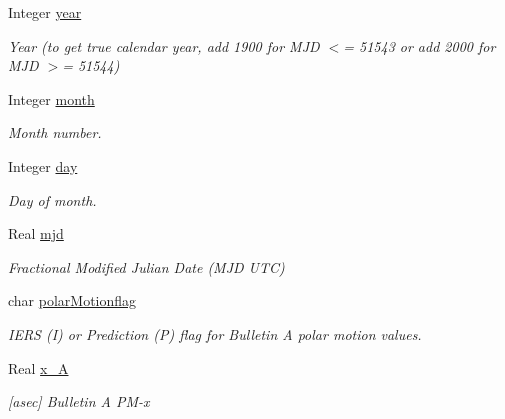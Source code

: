 \begin{DoxyCompactItemize}
\item 
Integer \hyperlink{structostk_1_1physics_1_1coord_1_1frame_1_1provider_1_1iers_1_1_finals2000_a_1_1_data_aaa754f31dcd1fa19aeb7bd78cb14350b}{year}
\begin{DoxyCompactList}\small\item\em Year (to get true calendar year, add 1900 for M\+JD $<$= 51543 or add 2000 for M\+JD $>$= 51544) \end{DoxyCompactList}\item 
Integer \hyperlink{structostk_1_1physics_1_1coord_1_1frame_1_1provider_1_1iers_1_1_finals2000_a_1_1_data_a0f2aaef83fa75a1531e6457b24cc214e}{month}
\begin{DoxyCompactList}\small\item\em Month number. \end{DoxyCompactList}\item 
Integer \hyperlink{structostk_1_1physics_1_1coord_1_1frame_1_1provider_1_1iers_1_1_finals2000_a_1_1_data_a13410abac810082e6ba0baf1d12bb68f}{day}
\begin{DoxyCompactList}\small\item\em Day of month. \end{DoxyCompactList}\item 
Real \hyperlink{structostk_1_1physics_1_1coord_1_1frame_1_1provider_1_1iers_1_1_finals2000_a_1_1_data_a70f37f98aee1bebe57bcc12fae786bda}{mjd}
\begin{DoxyCompactList}\small\item\em Fractional Modified Julian Date (M\+JD U\+TC) \end{DoxyCompactList}\item 
char \hyperlink{structostk_1_1physics_1_1coord_1_1frame_1_1provider_1_1iers_1_1_finals2000_a_1_1_data_addb5c9b23e9df67058548a881fcf7fb4}{polar\+Motionflag}
\begin{DoxyCompactList}\small\item\em I\+E\+RS (I) or Prediction (P) flag for Bulletin A polar motion values. \end{DoxyCompactList}\item 
Real \hyperlink{structostk_1_1physics_1_1coord_1_1frame_1_1provider_1_1iers_1_1_finals2000_a_1_1_data_aee1674860e371f2d5b7387fd4d1a7951}{x\+\_\+A}
\begin{DoxyCompactList}\small\item\em \mbox{[}asec\mbox{]} Bulletin A P\+M-\/x \end{DoxyCompactList}\item 

\end{DoxyCompactItemize}
